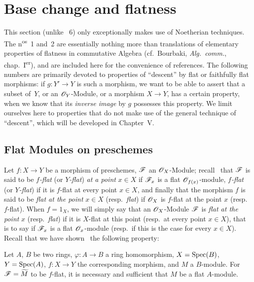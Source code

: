 \section{Base change and flatness}
\label{section:IV.2}


This section (unlike \textsection~6) only exceptionally makes use of Noetherian techniques.
The n\textsuperscript{os}~1 and~2 are essentially nothing more than translations of elementary properties of flatness in commutative Algebra (cf.~Bourbaki, \emph{Alg.~comm.}, chap.~I\textsuperscript{er}), and are included here for the convenience of references.
The following numbers are primarily devoted to properties of ``descent'' by flat or faithfully flat morphisms: if $g:Y'\to Y$ is such a morphism, we want to be able to assert that a subset of~$Y$, or an $\mathscr{O}_Y$-Module, or a morphism $X\to Y$, has a certain property, when we know that its \emph{inverse image} by $g$ possesses this property.
We limit ourselves here to properties that do not make use of the general technique of ``descent'', which will be developed in Chapter~V.

\subsection{Flat Modules on preschemes}
\label{subsection:IV.2.1}

\begin{env}[2.1.1]
\label{IV.2.1.1}
Let $f:X\to Y$ be a morphism of preschemes, $\mathscr{F}$ an $\mathscr{O}_X$-Module;
recall~ that $\mathscr{F}$ is said to be \emph{$f$-flat} (or \emph{$Y$-flat}) \emph{at a point} $x\in X$ if $\mathscr{F}_x$ is a flat $\mathscr{O}_{f(x)}$-module, \emph{$f$-flat} (or \emph{$Y$-flat}) if it is $f$-flat at every point $x\in X$, and finally that the morphism $f$ is said to be \emph{flat at the point} $x\in X$ (resp.\ \emph{flat}) if $\mathscr{O}_X$ is $f$-flat at the point $x$ (resp.\ $f$-flat).
When $f=1_X$, we will simply say that an $\mathscr{O}_X$-Module $\mathscr{F}$ is \emph{flat at the point} $x$ (resp.\ \emph{flat}) if it is $X$-flat at this point (resp.\ at every point $x\in X$), that is to say if $\mathscr{F}_x$ is a flat $\mathscr{O}_x$-module (resp.\ if this is the case for every $x\in X$).
Recall that we have shown~ the following property:
\end{env}

\begin{proposition}[2.1.2]
\label{IV.2.1.2}
Let $A$, $B$ be two rings, $\varphi:A\to B$ a ring homomorphism, $X=\operatorname{Spec}(B)$, $Y=\operatorname{Spec}(A)$, $f:X\to Y$ the corresponding morphism, and $M$ a $B$-module.
For $\mathscr{F}=\widetilde{M}$ to be $f$-flat, it is necessary and sufficient that $M$ be a flat $A$-module.
\end{proposition}

